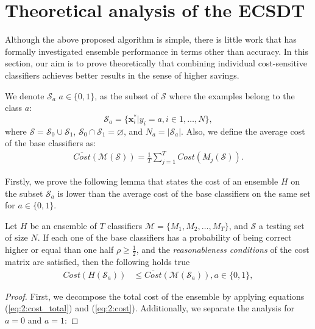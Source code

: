 {  
\section{Theoretical analysis of the ECSDT}
\label{sec:8:theoretical}

  Although the above proposed algorithm is simple, there is little work that has formally 
  investigated ensemble performance in terms other than accuracy. In this section, our aim is to 
  prove theoretically that combining individual cost-sensitive classifiers achieves better results 
  in the sense of higher savings.
  
  We denote $\mathcal{S}_a$ $a\in \{0,1\}$, as the subset of $\mathcal{S}$ 
  where the examples belong to the class $a$:
  \begin{equation}\label{eq:8:S_a}
    \mathcal{S}_a = \{\mathbf{x}_i^* \vert y_i = a, i \in 1,\dots,N\},
  \end{equation}
  where $\mathcal{S}=\mathcal{S}_0 \cup \mathcal{S}_1$, $\mathcal{S}_0 \cap \mathcal{S}_1 = 
  \varnothing$, and $N_a=\vert \mathcal{S}_a \vert$. Also, we define the average cost of the base 
  classifiers as:
  \begin{align}\label{eq:8:avg_cost}
    \overline{Cost} (\mathcal{M}(\mathcal{S}))= \frac{1}{T} \sum_{j=1}^{T} Cost(M_j(\mathcal{S})). 
  \end{align}
  
  \noindent Firstly, we prove the following lemma that states the cost of an ensemble $H$ on the 
  subset $\mathcal{S}_a$ is lower than the average cost of the base classifiers on the same set for 
  $a  \in \{0,1\}$.

  \begin{lemma}\label{lemma1}
  Let $H$ be an ensemble of $T$ classifiers $\mathcal{M}=\{M_1, M_2,\dots,M_T\}$, and 
  $\mathcal{S}$ a testing set of size $N$. If each one of the base classifiers has a probability 
  of being correct higher or equal than one half $\rho \ge \frac{1}{2}$, and the 
  \textit{reasonableness conditions} of the cost matrix are satisfied, then the following holds true
  \begin{align}\label{eq:8:lemma}
    Cost(H(\mathcal{S}_a)) &\le \overline{Cost} (\mathcal{M}(\mathcal{S}_a)) , a  \in\{0,1\}, 
  \end{align}
  \end{lemma}
  
  \begin{proof}
  First, we decompose the total cost of the ensemble by applying equations (\ref{eq:2:cost_total}) 
  and (\ref{eq:2:cost}). Additionally, we separate the analysis for $a=0$ and $a=1$:


\end{proof}}
